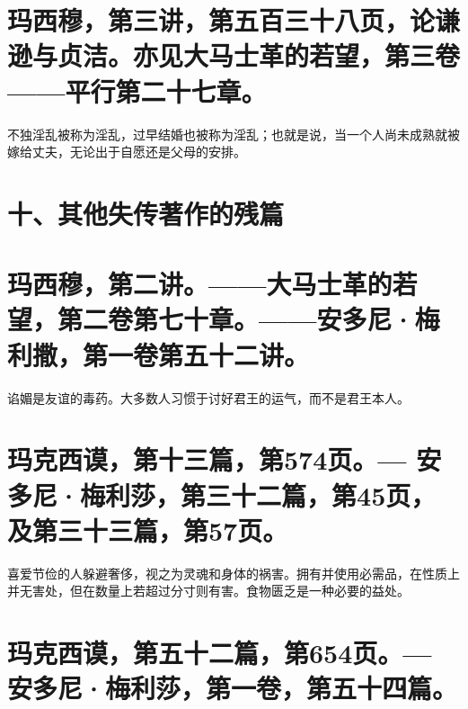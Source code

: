 
\section{玛西穆，第三讲，第五百三十八页，论谦逊与贞洁。亦见大马士革的若望，第三卷——平行第二十七章。}

不独淫乱被称为淫乱，过早结婚也被称为淫乱；也就是说，当一个人尚未成熟就被嫁给丈夫，无论出于自愿还是父母的安排。\par


\section{十、其他失传著作的残篇}


\section{玛西穆，第二讲。——大马士革的若望，第二卷第七十章。——安多尼·梅利撒，第一卷第五十二讲。}

谄媚是友谊的毒药。大多数人习惯于讨好君王的运气，而不是君王本人。\par


\section{玛克西谟，第十三篇，第574页。— 安多尼·梅利莎，第三十二篇，第45页，及第三十三篇，第57页。}

喜爱节俭的人躲避奢侈，视之为灵魂和身体的祸害。拥有并使用必需品，在性质上并无害处，但在数量上若超过分寸则有害。食物匮乏是一种必要的益处。\par


\section{玛克西谟，第五十二篇，第654页。— 安多尼·梅利莎，第一卷，第五十四篇。}

